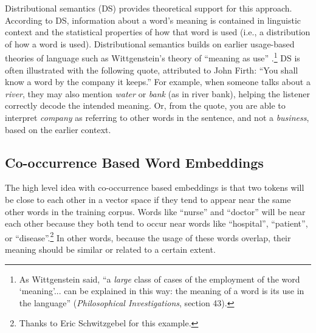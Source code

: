 Distributional semantics (DS) provides theoretical support for this approach. According to DS, information about a word's meaning is contained in linguistic context \cite{harris1954distributional, firth1957synopsis} and the statistical properties of how that word is used (i.e., a distribution of how a word is used). Distributional semantics builds on earlier usage-based theories of language such as Wittgenstein's theory of ``meaning as use'' \cite{wittgenstein1953philosophical}.\footnote{As Wittgenstein said, ``a \emph{large} class of cases of the employment of the word `meaning'... can be explained in this way: the meaning of a word is its use in the language'' (\emph{Philosophical Investigations}, section 43).} DS is often illustrated with the following quote, attributed to John Firth: ``You shall know a word by the company it keeps.'' For example, when someone talks about a \textit{river}, they may also mention \textit{water} or \textit{bank} (as in river bank), helping the listener correctly decode the intended meaning. Or, from the quote, you are able to interpret \textit{company} as referring to other words in the sentence, and not a \textit{business}, based on the earlier context.

\subsection{Co-occurrence Based Word Embeddings}


The high level idea with co-occurrence based embeddings is that two tokens will be close to each other in a vector space if they tend to appear near the same other words in the training corpus. Words like ``nurse'' and ``doctor'' will be near each other because they both tend to occur near words like ``hospital'', ``patient'', or ``disease''.\footnote{Thanks to Eric Schwitzgebel for this example.} In other words, because the usage of these words overlap, their meaning should be similar or related to a certain extent. 

